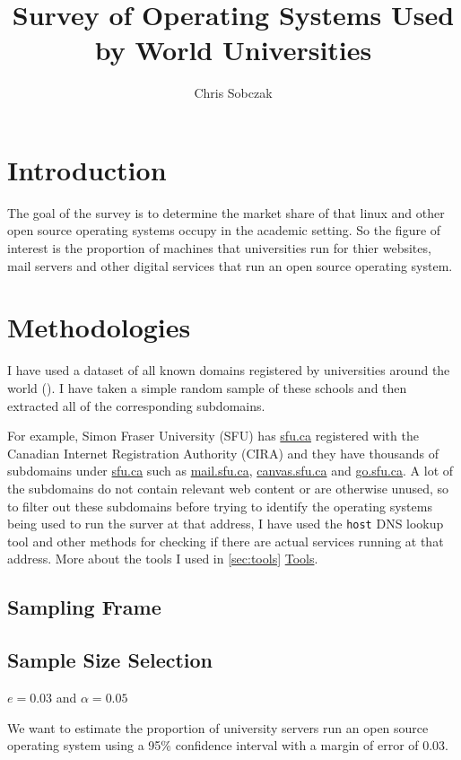\documentclass{article}
\author{Chris Sobczak}
\title{Survey of Operating Systems Used by World Universities}
\theoremstyle{definition}
\begin{document}
\maketitle
\begin{flushleft}



\section{Introduction}
The goal of the survey is to determine the market share
of that linux and other open source operating systems
occupy in the academic setting. So the
figure of interest is the proportion of machines that
universities run for thier websites, mail servers and other
digital services that run an open source operating system.

\section{Methodologies}
I have used a dataset of all known domains registered by
universities around the world (\cite{Hipo}). I have taken a simple random
sample of these schools and then extracted all of the corresponding
subdomains.

For example, Simon Fraser University (SFU) has \url{sfu.ca} registered with
the Canadian Internet Registration Authority (CIRA) and
they have thousands of subdomains under \url{sfu.ca} such as \url{mail.sfu.ca},
\url{canvas.sfu.ca} and \url{go.sfu.ca}. A lot of the subdomains do not
contain relevant web content or are otherwise unused, so to filter out these
subdomains before trying to identify the operating systems being
used to run the surver at that address, I have used the \texttt{host} DNS
lookup tool and other methods for checking if there are actual services running
at that address. More about the tools I used in \autoref{sec:tools} \hyperref[sec:tools]{Tools}.

\subsection{Sampling Frame}


\subsection{Sample Size Selection}
$e=0.03$ and $\alpha=0.05$ \cite{lohr2019}

We want to estimate the proportion of university servers
run an open source operating system using a 95\% confidence
interval with a margin of error of 0.03.


\end{flushleft}
\end{document}
